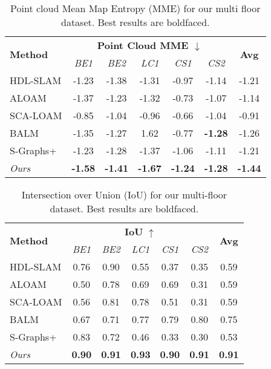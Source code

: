 \begin{table}[t]
\centering
\renewcommand{\arraystretch}{1.1} 
\setlength{\tabcolsep}{4pt}     
\scriptsize
\caption{Point cloud Mean Map Entropy (MME) for our multi floor dataset. Best results are boldfaced.}
\begin{tabular}{l|ccccc|c}
\toprule
\multirow{2}{*}{\textbf{Method}} & \multicolumn{5}{c|}{\textbf{Point Cloud MME $\downarrow$}} & \multirow{2}{*}{\textbf{Avg}} \\
\cmidrule(lr){2-6}
 & \textit{BE1} & \textit{BE2} & \textit{LC1} & \textit{CS1} & \textit{CS2} & \\
\midrule
HDL-SLAM \cite{hdl_graph_slam} & -1.23 & -1.38 & -1.31 & -0.97 & -1.14 & -1.21 \\ 
ALOAM \cite{loam}             & -1.37 & -1.23 & -1.32 & -0.73 & -1.07 & -1.14 \\ 
SCA-LOAM \cite{scan_context}   & -0.85 & -1.04 & -0.96 & -0.66 & -1.04 & -0.91 \\ 
BALM \cite{BALM}              & -1.35 & -1.27 & 1.62  & -0.77 & \textbf{-1.28} & -1.26 \\ 
S-Graphs+ \cite{s_graphs+}     & -1.23 & -1.28 & -1.37 & -1.06 & -1.11 & -1.21 \\ 
\midrule
\textit{Ours}                & \textbf{-1.58} & \textbf{-1.41} & \textbf{-1.67} & \textbf{-1.24} & \textbf{-1.28} & \textbf{-1.44} \\
\bottomrule
\end{tabular}
\label{tab:mme_real_data}
\end{table}


\begin{table}[]
\centering
\renewcommand{\arraystretch}{1.2} 
\setlength{\tabcolsep}{4pt}     
\scriptsize
\caption{Intersection over Union (IoU) for our multi-floor dataset. Best results are boldfaced.}
\label{tab:iou_multi_floor}
\begin{tabular}{l|ccccc|c}
\toprule
\multirow{2}{*}{\textbf{Method}} & \multicolumn{5}{c|}{\textbf{IoU} $\uparrow$} & \multirow{2}{*}{\textbf{Avg}} \\
\cmidrule(lr){2-6}
 & \textit{BE1} & \textit{BE2} & \textit{LC1} & \textit{CS1} & \textit{CS2} & \\
\midrule
HDL-SLAM \cite{hdl_graph_slam} & 0.76 & 0.90 & 0.55 & 0.37 & 0.35 & 0.59 \\ 
ALOAM \cite{loam}             & 0.50 & 0.78 & 0.69 & 0.69 & 0.31 & 0.59 \\ 
SCA-LOAM \cite{scan_context}   & 0.56 & 0.81 & 0.78 & 0.51 & 0.31 & 0.59 \\ 
BALM \cite{BALM}              & 0.67 & 0.71 & 0.77 & 0.79 & 0.80 & 0.75 \\ 
S-Graphs+ \cite{s_graphs+}     & 0.83 & 0.72 & 0.46 & 0.33 & 0.30 & 0.53 \\ 
\midrule
\textit{Ours}  & \textbf{0.90} & \textbf{0.91} & \textbf{0.93} & \textbf{0.90} & \textbf{0.91} & \textbf{0.91} \\
\bottomrule
\end{tabular}
\end{table}


